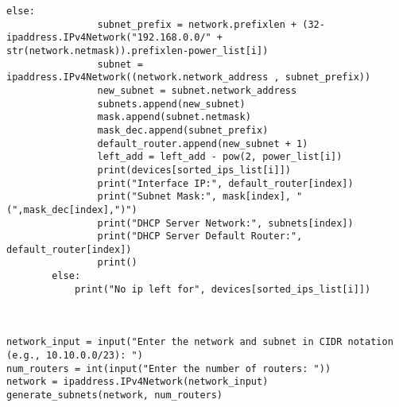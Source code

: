 \begin{lstlisting}[style=pythonStyle, caption={Automated Subnet Allocation.}, backgroundcolor=\color{codebackground}]
            else: 
                subnet_prefix = network.prefixlen + (32-ipaddress.IPv4Network("192.168.0.0/" + str(network.netmask)).prefixlen-power_list[i])
                subnet = ipaddress.IPv4Network((network.network_address , subnet_prefix))
                new_subnet = subnet.network_address 
                subnets.append(new_subnet)
                mask.append(subnet.netmask)
                mask_dec.append(subnet_prefix)
                default_router.append(new_subnet + 1)
                left_add = left_add - pow(2, power_list[i])
                print(devices[sorted_ips_list[i]])
                print("Interface IP:", default_router[index])
                print("Subnet Mask:", mask[index], "(",mask_dec[index],")")
                print("DHCP Server Network:", subnets[index])
                print("DHCP Server Default Router:", default_router[index])
                print()
        else:
            print("No ip left for", devices[sorted_ips_list[i]])



network_input = input("Enter the network and subnet in CIDR notation (e.g., 10.10.0.0/23): ")
num_routers = int(input("Enter the number of routers: "))
network = ipaddress.IPv4Network(network_input)
generate_subnets(network, num_routers)

          
\end{lstlisting}

